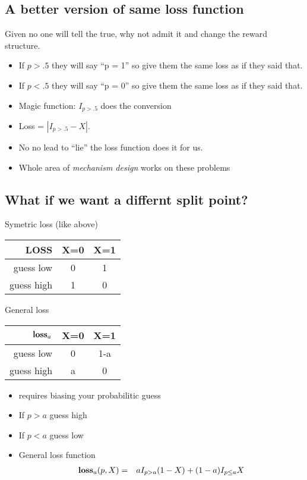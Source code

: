 \documentclass[12pt]{extarticle} %
\begin{document}
\subsection*{A better version of same loss function}
Given no one will tell the true, why not admit it and change the
reward structure.
\begin{itemize}
\item If $p > .5$ they will say ``p = 1'' so give them the same loss
as if they said that.
\item If $p < .5$ they will say ``p = 0'' so give them the same loss
as if they said that.
\item Magic function: $I_{p > .5}$ does the conversion
\item Loss = $|I_{p > .5} - X|$.
\item No no lead to ``lie'' the loss function does it for us.
\item Whole area of {\em mechanism design} works on these problems
\end{itemize}

\subsection*{What if we want a differnt split point?}

Symetric loss (like above) \\
\begin{tabular}{r|c|c}
{\bf LOSS} & X=0 & X=1 \\ \hline
guess low  & 0   & 1  \\ \hline
guess high & 1   & 0 
\end{tabular}

General loss\\
\begin{tabular}{r|c|c}
$\hbox{\bf loss}_a$ & X=0 & X=1 \\ \hline
guess low  & 0   & 1-a  \\ \hline
guess high & a   & 0 
\end{tabular}

\begin{itemize}
\item requires biasing your probabilitic guess
\item If $p>a$ guess high
\item If $p<a$ guess low
\item General loss function
\begin{eqnarray*}
\hbox{\bf loss}_a(p,X) &= & aI_{p > a}(1-X) + (1-a)I_{p \le a}X \\
\end{eqnarray*}

\end{itemize}
\end{document}
